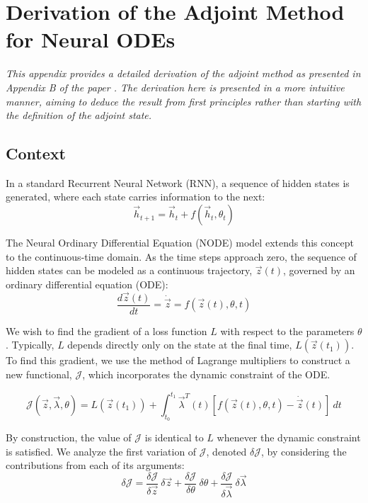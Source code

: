 \section{Derivation of the Adjoint Method for Neural ODEs}
\label{app:adjoint_method}

\textit{This appendix provides a detailed derivation of the adjoint method as presented in Appendix B of the paper 
\cite{chen2019neuralordinarydifferentialequations}. 
The derivation here is presented in a more intuitive manner, aiming to deduce the result from 
first principles rather than starting with the definition of the adjoint state.}

\subsection{Context}

In a standard Recurrent Neural Network (RNN), a sequence of hidden states is generated, 
where each state carries information to the next:
\begin{equation}
    \vec{h}_{t+1} = \vec{h}_t + f(\vec{h}_t, \theta_t)
\end{equation}

The Neural Ordinary Differential Equation (NODE) model extends this concept to the continuous-time domain. 
As the time steps approach zero, the sequence of hidden states can be modeled as a continuous trajectory,
$\vec{z}(t)$, governed by an ordinary differential equation (ODE):
\begin{equation}
    \frac{d\vec{z}(t)}{dt} = \dot{\vec{z}} = f(\vec{z}(t), \theta, t)
    \label{eq:node_dynamics}
\end{equation}

We wish to find the gradient of a loss function $L$ with respect to the parameters $\theta$. 
Typically, $L$ depends directly only on the state at the final time, $L(\vec{z}(t_1))$. 
To find this gradient, we use the method of Lagrange multipliers to construct a new functional, $\mathcal{J}$, 
which incorporates the dynamic constraint of the ODE.

\begin{equation}
    \mathcal{J}(\vec{z}, \vec{\lambda}, \theta) =
    L(\vec{z}(t_1)) +
    \int_{t_0}^{t_1} \vec{\lambda}^{T}(t)
    \left[
    f(\vec{z}(t), \theta, t) - \dot{\vec{z}}(t)
    \right]
    \ dt
    \label{eq:adjoint_functional}
\end{equation}

By construction, the value of $\mathcal{J}$ is identical to $L$ whenever the dynamic constraint is satisfied. 
We analyze the first variation of $\mathcal{J}$, denoted $\delta\mathcal{J}$, by considering the contributions from each of its arguments:
\begin{equation}
    \delta \mathcal{J} =
    \frac{\delta \mathcal{J}}{\delta \vec{z}}\ \delta \vec{z} +
    \frac{\delta \mathcal{J}}{\delta \theta}\ \delta \theta +
    \frac{\delta \mathcal{J}}{\delta \vec{\lambda}}\ \delta \vec{\lambda}
\end{equation}

